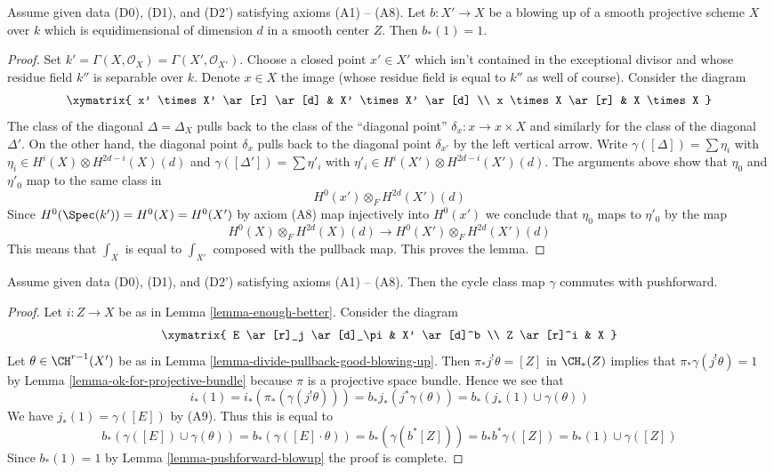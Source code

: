 \begin{lemma}
\label{lemma-pushforward-blowup}
Assume given data (D0), (D1), and (D2') satisfying axioms (A1) -- (A8).
Let $b : X' \to X$ be a blowing up of a smooth projective scheme $X$
over $k$ which is equidimensional of dimension $d$ in a smooth center $Z$.
Then $b_*(1) = 1$.
\end{lemma}

\begin{proof}
Set $k' = \Gamma(X, \mathcal{O}_X) = \Gamma(X', \mathcal{O}_{X'})$.
Choose a closed point $x' \in X'$ which isn't contained in the exceptional
divisor and whose residue field $k''$ is separable over $k$.
Denote $x \in X$ the image (whose residue field is equal to $k''$
as well of course). Consider the diagram
$$
\xymatrix{
x' \times X' \ar[r] \ar[d] & X' \times X' \ar[d] \\
x \times X \ar[r] & X \times X
}
$$
The class of the diagonal $\Delta = \Delta_X$ pulls back to the class of the
``diagonal point'' $\delta_x : x \to x \times X$ and similarly for the class of
the diagonal $\Delta'$. On the other hand, the diagonal point $\delta_x$
pulls back to the diagonal point $\delta_{x'}$ by the left vertical arrow.
Write $\gamma([\Delta]) = \sum \eta_i$ with
$\eta_i \in H^i(X) \otimes H^{2d - i}(X)(d)$ and
$\gamma([\Delta']) = \sum \eta'_i$ with
$\eta'_i \in H^i(X') \otimes H^{2d - i}(X')(d)$.
The arguments above show that $\eta_0$ and $\eta'_0$ map to the same
class in
$$
H^0(x') \otimes_F H^{2d}(X')(d)
$$
Since $H^0(\Spec(k')) = H^0(X) = H^0(X')$ by axiom (A8) map injectively
into $H^0(x')$ we conclude that $\eta_0$ maps to $\eta'_0$ by the map
$$
H^0(X) \otimes_F H^{2d}(X)(d)
\longrightarrow
H^0(X') \otimes_F H^{2d}(X')(d)
$$
This means that $\int_X$ is equal to $\int_{X'}$ composed with
the pullback map. This proves the lemma.
\end{proof}

\begin{lemma}
\label{lemma-done}
Assume given data (D0), (D1), and (D2') satisfying axioms (A1) -- (A8).
Then the cycle class map $\gamma$ commutes with pushforward.
\end{lemma}

\begin{proof}
Let $i : Z \to X$ be as in Lemma \ref{lemma-enough-better}. Consider
the diagram
$$
\xymatrix{
E \ar[r]_j \ar[d]_\pi & X' \ar[d]^b \\
Z \ar[r]^i & X
}
$$
Let $\theta \in \CH^{r - 1}(X')$ be as in
Lemma \ref{lemma-divide-pullback-good-blowing-up}.
Then $\pi_*j^!\theta = [Z]$ in $\CH_*(Z)$ implies that
$\pi_*\gamma(j^!\theta) = 1$ by Lemma \ref{lemma-ok-for-projective-bundle}
because $\pi$ is a projective space bundle.
Hence we see that
$$
i_*(1) = i_*(\pi_*(\gamma(j^!\theta))) =
b_*j_*(j^*\gamma(\theta)) =
b_*(j_*(1) \cup \gamma(\theta))
$$
We have $j_*(1) = \gamma([E])$ by (A9). Thus this is equal to
$$
b_*(\gamma([E]) \cup \gamma(\theta)) =
b_*(\gamma([E] \cdot \theta)) =
b_*(\gamma(b^*[Z])) =
b_*b^*\gamma([Z]) = b_*(1) \cup \gamma([Z])
$$
Since $b_*(1) = 1$ by Lemma \ref{lemma-pushforward-blowup} the
proof is complete.
\end{proof}

